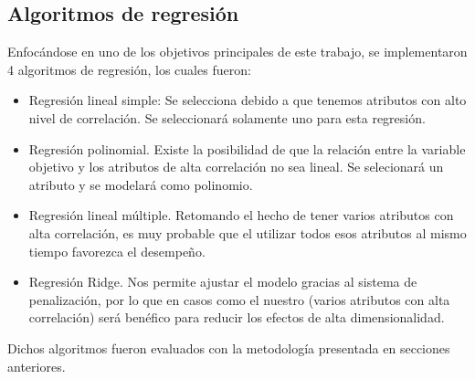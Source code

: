 \FloatBarrier
\subsection{Algoritmos de regresión}
Enfocándose en uno de los objetivos principales de este trabajo, se implementaron 4 algoritmos de regresión, los cuales fueron:

\begin{itemize}
	\item Regresión lineal simple: Se selecciona debido a que tenemos atributos con alto nivel de correlación. Se seleccionará solamente uno para esta regresión.
	\item Regresión polinomial. Existe la posibilidad de que la relación entre la variable objetivo y los atributos de alta correlación no sea lineal. Se selecionará un atributo y se modelará como polinomio.
	\item Regresión lineal múltiple. Retomando el hecho de tener varios atributos con alta correlación, es muy probable que el utilizar todos esos atributos al mismo tiempo favorezca el desempeño.
	\item Regresión Ridge. Nos permite ajustar el modelo gracias al sistema de penalización, por lo que en casos como el nuestro (varios atributos con alta correlación) será benéfico para reducir los efectos de alta dimensionalidad.
\end{itemize}

Dichos algoritmos fueron evaluados con la metodología presentada en secciones anteriores.
